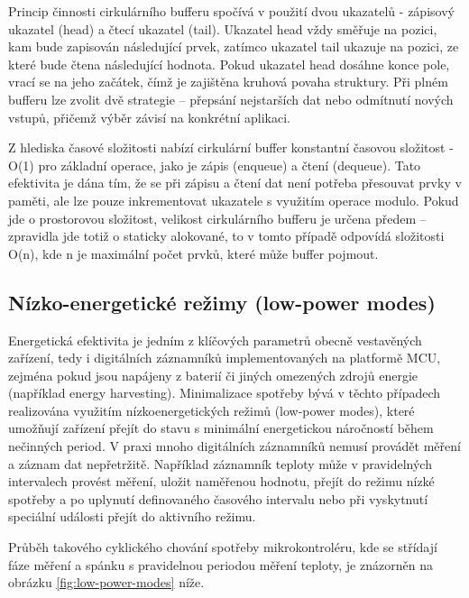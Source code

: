 Princip činnosti cirkulárního bufferu spočívá v použití dvou ukazatelů - zápisový ukazatel (head) a čtecí ukazatel (tail). Ukazatel head vždy směřuje na pozici, kam bude zapisován následující prvek, zatímco ukazatel tail ukazuje na pozici, ze které bude čtena následující hodnota. Pokud ukazatel head dosáhne konce pole, vrací se na jeho začátek, čímž je zajištěna kruhová povaha struktury. Při plném bufferu lze zvolit dvě strategie – přepsání nejstarších dat nebo odmítnutí nových vstupů, přičemž výběr závisí na konkrétní aplikaci. \cite{embedjournal_ring_buffer, medium_ring_buffer}

Z hlediska časové složitosti nabízí cirkulární buffer konstantní časovou složitost - O(1) pro základní operace, jako je zápis (enqueue) a  čtení (dequeue). Tato efektivita je dána tím, že se při zápisu a čtení dat není potřeba přesouvat prvky v paměti, ale lze pouze inkrementovat ukazatele s využitím operace modulo. Pokud jde o prostorovou složitost, velikost cirkulárního bufferu je určena předem – zpravidla jde totiž o staticky alokované, to v tomto případě odpovídá složitosti O(n), kde n je maximální počet prvků, které může buffer pojmout. \cite{petrungaro_ring_buffer_complexity}

\subsection{Nízko-energetické režimy (low-power modes)}
\label{nizko_energeticke_rezimy}
Energetická efektivita je jedním z klíčových parametrů obecně vestavěných zařízení, tedy i digitálních záznamníků implementovaných na platformě MCU, zejména pokud jsou napájeny z baterií či jiných omezených zdrojů energie (například energy harvesting). Minimalizace spotřeby bývá v těchto případech realizována využitím nízkoenergetických režimů (low-power modes), které umožňují zařízení přejít do stavu s minimální energetickou náročností během nečinných period. V praxi mnoho digitálních záznamníků nemusí provádět měření a záznam dat nepřetržitě. Například záznamník teploty může v pravidelných intervalech provést měření, uložit naměřenou hodnotu, přejít do režimu nízké spotřeby a po uplynutí definovaného časového intervalu nebo při vyskytnutí speciální události přejít do aktivního režimu. \cite{analog_devices_low_power_modes}

Průběh takového cyklického chování spotřeby mikrokontroléru, kde se střídají fáze měření a spánku s pravidelnou periodou měření teploty, je znázorněn na obrázku \ref{fig:low-power-modes} níže.

